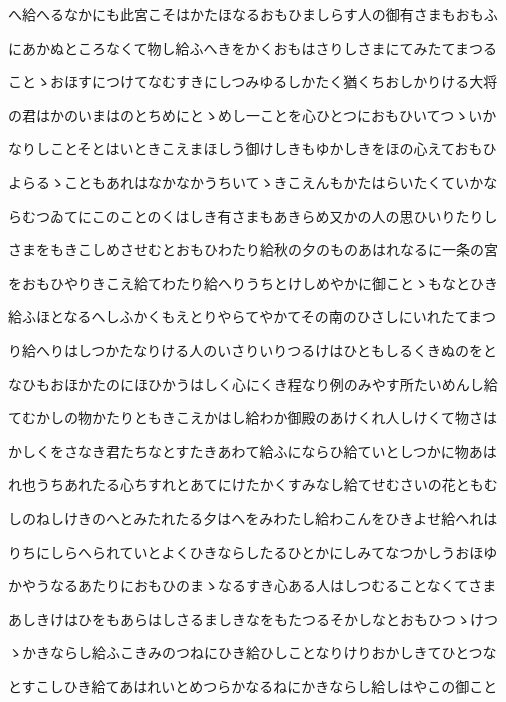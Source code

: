 \documentclass[a4paper,11pt,landscape]{ltjtarticle}
\begin{document}
\par\medskip
へ給へるなかにも此宮こそはかたほなるおもひましらす人の御有さまもおもふ
\par\medskip
にあかぬところなくて物し給ふへきをかくおもはさりしさまにてみたてまつる
\par\medskip
ことゝおほすにつけてなむすきにしつみゆるしかたく猶くちおしかりける大将
\par\medskip
の君はかのいまはのとちめにとゝめし一ことを心ひとつにおもひいてつゝいか
\par\medskip
なりしことそとはいときこえまほしう御けしきもゆかしきをほの心えておもひ
\par\medskip
よらるゝこともあれはなかなかうちいてゝきこえんもかたはらいたくていかな
\par\medskip
らむつゐてにこのことのくはしき有さまもあきらめ又かの人の思ひいりたりし
\par\medskip
さまをもきこしめさせむとおもひわたり給秋の夕のものあはれなるに一条の宮
\par\medskip
をおもひやりきこえ給てわたり給へりうちとけしめやかに御ことゝもなとひき
\par\medskip
給ふほとなるへしふかくもえとりやらてやかてその南のひさしにいれたてまつ
\par\medskip
り給へりはしつかたなりける人のいさりいりつるけはひともしるくきぬのをと
\par\medskip
なひもおほかたのにほひかうはしく心にくき程なり例のみやす所たいめんし給
\par\medskip
てむかしの物かたりともきこえかはし給わか御殿のあけくれ人しけくて物さは
\par\medskip
かしくをさなき君たちなとすたきあわて給ふにならひ給ていとしつかに物あは
\par\medskip
れ也うちあれたる心ちすれとあてにけたかくすみなし給てせむさいの花ともむ
\par\medskip
しのねしけきのへとみたれたる夕はへをみわたし給わこんをひきよせ給へれは
\par\medskip
りちにしらへられていとよくひきならしたるひとかにしみてなつかしうおほゆ
\par\medskip
かやうなるあたりにおもひのまゝなるすき心ある人はしつむることなくてさま
\par\medskip
あしきけはひをもあらはしさるましきなをもたつるそかしなとおもひつゝけつ
\par\medskip
ゝかきならし給ふこきみのつねにひき給ひしことなりけりおかしきてひとつな
\par\medskip
とすこしひき給てあはれいとめつらかなるねにかきならし給しはやこの御こと
\end{document}
